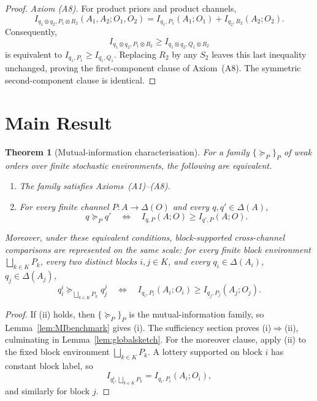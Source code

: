\documentclass[11pt,a4paper]{article}
\newtheorem{theorem}{Theorem}
\theoremstyle{definition}
\newcommand{\1}{\mathbf 1}
\begin{document}
\begin{proof}
\emph{Axiom \textup{(A8)}.}
For product priors and product channels,
\[
I_{q_1\otimes q_2,P_1\otimes R_2}(A_1,A_2;O_1,O_2)
=
I_{q_1,P_1}(A_1;O_1)+I_{q_2,R_2}(A_2;O_2).
\tag{N4}
\]
Consequently,
\[
I_{q_1\otimes q_2,P_1\otimes R_2}
\ge
I_{q_1\otimes q_2,Q_1\otimes R_2}
\]
is equivalent to $I_{q_1,P_1}\ge I_{q_1,Q_1}$.  Replacing $R_2$ by any $S_2$ leaves this last inequality unchanged, proving
the first-component clause of Axiom~\textup{(A8)}.  The symmetric second-component clause is identical.
\end{proof}

\section*{Main Result}

\begin{theorem}[Mutual-information characterisation]\label{thm:main}
For a family $\{\succeq_P\}_P$ of weak orders over finite stochastic environments, the following are equivalent.
\begin{enumerate}[label=\textup{(\roman*)},leftmargin=*]
\item The family satisfies Axioms~\textup{(A1)--(A8)}.
\item For every finite channel $P:A\to\Delta(O)$ and every $q,q'\in\Delta(A)$,
\[
q\succeq_P q'
\quad\Longleftrightarrow\quad
I_{q,P}(A;O)\ge I_{q',P}(A;O).
\]
\end{enumerate}
Moreover, under these equivalent conditions, block-supported cross-channel comparisons are represented on the same
scale: for every finite block environment $\bigsqcup_{k\in K}P_k$, every two distinct blocks $i,j\in K$, and every
$q_i\in\Delta(A_i)$, $q_j\in\Delta(A_j)$,
\[
q_i^i\succeq_{\bigsqcup_{k\in K}P_k}q_j^j
\quad\Longleftrightarrow\quad
I_{q_i,P_i}(A_i;O_i)\ge I_{q_j,P_j}(A_j;O_j).
\]
\end{theorem}

\begin{proof}
If \textup{(ii)} holds, then $\{\succeq_P\}_P$ is the mutual-information family, so
Lemma~\ref{lem:MIbenchmark} gives \textup{(i)}.  The sufficiency section proves \textup{(i)$\Rightarrow$(ii)},
culminating in Lemma~\ref{lem:globalsketch}.  For the moreover clause, apply
\textup{(ii)} to the fixed block environment $\bigsqcup_{k\in K}P_k$.  A lottery supported on block $i$ has constant
block label, so
\[
I_{q_i^i,\bigsqcup_{k\in K}P_k}=I_{q_i,P_i}(A_i;O_i),
\]
and similarly for block $j$.
\end{proof}
\end{document}
